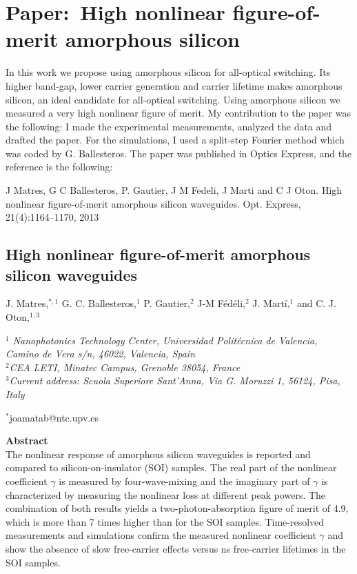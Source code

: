 \chapter{Paper:~High nonlinear figure-of-merit amorphous silicon}
\label{ch:articleFigureOfMerit}
In this work we propose using amorphous silicon for all-optical switching. Its higher band-gap, lower carrier generation and carrier lifetime makes amorphous silicon, an ideal candidate for all-optical switching.
Using amorphous silicon we measured a very high nonlinear figure of merit.
My contribution to the paper was the following: I made the experimental measurements, analyzed the data and drafted the paper. For the simulations, I used a split-step Fourier method which was coded by G. Ballesteros. The paper was published in Optics Express, and the reference is the following:

\vspace{1.5cm}

J Matres, G C Ballesteros, P. Gautier, J M Fedeli, J Marti and C J Oton. High nonlinear figure-of-merit amorphous silicon waveguides. Opt. Express, 21(4):1164–1170, 2013

\newpage
\begin{center}
\section*{High nonlinear figure-of-merit amorphous silicon waveguides}
{J. Matres,$^{*,1}$ G. C. Ballesteros,$^1$ P. Gautier,$^2$ J-M F\'ed\'eli,$^2$  J. Mart\'i,$^1$ and C. J. Oton,$^{1,3}$} 
\end{center}

\noindent
\textit{$^1$ Nanophotonics Technology Center, Universidad Polit\'ecnica de Valencia, Camino de Vera s/n, 46022, Valencia, Spain\\
$^2$CEA LETI, Minatec Campus, Grenoble 38054, France\\
$^3$Current address: Scuola Superiore Sant'Anna, Via G. Moruzzi 1, 56124, Pisa, Italy}

\begin{center}
{$^*$joamatab@ntc.upv.es}
\end{center}


\textbf{Abstract} \\
\noindent
The nonlinear response of amorphous silicon waveguides is reported and compared to silicon-on-insulator (SOI) samples.
The real part of the nonlinear coefficient $\gamma$ is measured by four-wave-mixing and the imaginary part of $\gamma$ is characterized by measuring the nonlinear loss at different peak powers.
The combination of both results yields a two-photon-absorption figure of merit of 4.9, which is more than 7 times higher than for the SOI samples.
Time-resolved measurements and simulations confirm the measured nonlinear coefficient $\gamma$ and show the absence of slow free-carrier effects versus ns free-carrier lifetimes in the SOI samples.


